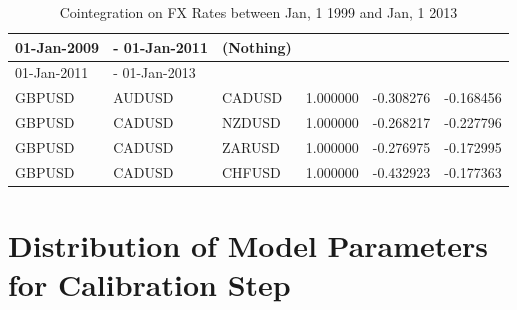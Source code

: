\documentclass[11pt,a4,twosided,singlespacing,titlepagenumber=on]{scrreprt}
\numberwithin{equation}{chapter} %
\theoremstyle{remark}
\begin{document}
\begin{table}[H]
\begin{tabular}{llllll}
\hline
01-Jan-2009 &- 01-Jan-2011 &  (Nothing)\\
\hline
01-Jan-2011 &- 01-Jan-2013\\
\hline
GBPUSD & AUDUSD & CADUSD & 1.000000& -0.308276& -0.168456 \\
GBPUSD & CADUSD & NZDUSD & 1.000000& -0.268217& -0.227796 \\
GBPUSD & CADUSD & ZARUSD & 1.000000& -0.276975& -0.172995 \\
GBPUSD & CADUSD & CHFUSD & 1.000000& -0.432923& -0.177363 \\
\hline
\end{tabular}
\caption{Cointegration on FX Rates between Jan, 1 1999 and Jan, 1 2013}
\label{coint_fx}
\end{table}

\section{Distribution of Model Parameters for Calibration Step}
\label{app:distribution_model_parameters_m7}
\end{document}
